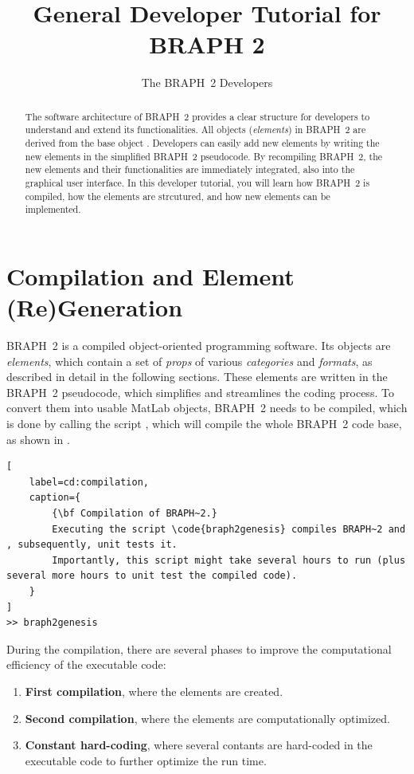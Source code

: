 \documentclass{tufte-handout}
\title{General Developer Tutorial for BRAPH 2}
\author[The BRAPH~2 Developers]{The BRAPH~2 Developers}
\begin{document}
\maketitle

\begin{abstract}
\noindent
The software architecture of BRAPH~2 provides a clear structure for developers to understand and extend its functionalities. All objects (\emph{elements}) in BRAPH~2 are derived from the base object . Developers can easily add new elements by writing the new elements in the simplified BRAPH~2 pseudocode. 
By recompiling BRAPH~2, the new elements and their functionalities are immediately integrated, also into the graphical user interface.
In this developer tutorial, you will learn how BRAPH~2 is compiled, how the elements are strcutured, and how new elements can be implemented.
\end{abstract}

\tableofcontents

\clearpage
\section{Compilation and Element (Re)Generation}

BRAPH~2 is a compiled object-oriented programming software.
Its objects are \emph{elements}, which contain a set of \emph{props} of various \emph{categories} and \emph{formats}, as described in detail in the following sections. 
These elements are written in the BRAPH~2 pseudocode, which simplifies and streamlines the coding process.
To convert them into usable MatLab objects, BRAPH~2 needs to be compiled, which is done by calling the script , which will compile the whole BRAPH~2 code base, as shown in .

\begin{lstlisting}[
	label=cd:compilation,
	caption={
		{\bf Compilation of BRAPH~2.}
		Executing the script \code{braph2genesis} compiles BRAPH~2 and , subsequently, unit tests it.
		Importantly, this script might take several hours to run (plus several more hours to unit test the compiled code).
	}
]
>> braph2genesis
\end{lstlisting}

During the compilation, there are several phases to improve the computational efficiency of the executable code:
\begin{enumerate}

\item{} {\bf First compilation}, where the elements are created.

\item{} {\bf Second compilation}, where the elements are computationally optimized.

\item{} {\bf Constant hard-coding}, where several contants are hard-coded in the executable code to further optimize the run time.

\end{enumerate}
\end{document}
